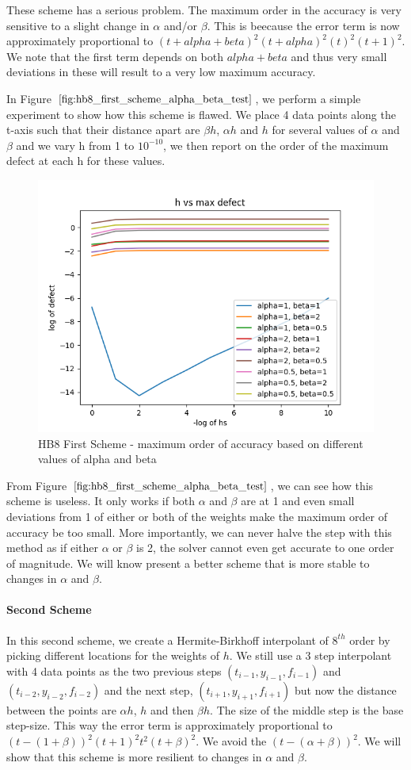 \documentclass{article}
\begin{document}
These scheme has a serious problem. The maximum order in the accuracy is very sensitive to a slight change in $\alpha$ and/or $\beta$. This is beecause the error term is now approximately proportional to $(t + alpha + beta)^2(t+alpha)^2(t)^2(t+1)^2$. We note that the first term depends on both $alpha + beta$ and thus very small deviations in these will result to a very low maximum accuracy. 

In Figure $\ref{fig:hb8_first_scheme_alpha_beta_test}$, we perform a simple experiment to show how this scheme is flawed. We place 4 data points along the t-axis such that their distance apart are $\beta h$, $\alpha h$ and $h$ for several values of $\alpha$ and $\beta$ and we vary h from 1 to $10^{-10}$, we then report on the order of the maximum defect at each h for these values.

\begin{figure}[H]
\centering
\includegraphics[width=0.7\linewidth]{./figures/hb8_first_scheme_alpha_beta_test}
\caption{HB8 First Scheme - maximum order of accuracy based on different values of alpha and beta}
\label{fig:hb8_first_scheme_alpha_beta_test}
\end{figure}

From Figure $\ref{fig:hb8_first_scheme_alpha_beta_test}$, we can see how this scheme is useless. It only works if both $\alpha$ and $\beta$ are at 1 and even small deviations from 1 of either or both of the weights make the maximum order of accuracy be too small. More importantly, we can never halve the step with this method as if either $\alpha$ or $\beta$ is 2, the solver cannot even get accurate to one order of magnitude. We will know present a better scheme that is more stable to changes in $\alpha$ and $\beta$.

\paragraph{Second Scheme}
In this second scheme, we create a Hermite-Birkhoff interpolant of $8^{th}$ order by picking different locations for the weights of $h$. We still use a 3 step interpolant with 4 data points as the two previous steps $(t_{i-1}, y_{i-1}, f_{i-1})$ and $(t_{i-2}, y_{i-2}, f_{i-2})$ and the next step, $(t_{i+1}, y_{i+1}, f_{i+1})$ but now the distance between the points are $\alpha h$, $h$ and then $\beta h$. The size of the middle step is the base step-size. This way the error term is approximately proportional to $(t- (1+\beta))^2(t+1)^2t^2(t+\beta)^2$. We avoid the $(t-(\alpha+\beta))^2$. We will show that this scheme is more resilient to changes in $\alpha$ and $\beta$.
\end{document}
